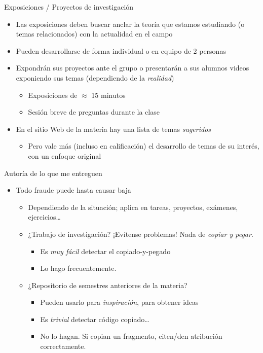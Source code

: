 \documentclass[presentation]{beamer}
\begin{document}
\begin{frame}[label={sec:org58a822f}]{Exposiciones / Proyectos de investigación}
\begin{itemize}
\item Las exposiciones deben buscar anclar la teoría que estamos
estudiando (o temas relacionados) con la actualidad en el campo
\item Pueden desarrollarse de forma individual o en equipo de 2 personas
\item Expondrán sus proyectos ante el grupo o presentarán a sus alumnos
videos exponiendo sus temas (dependiendo de la \emph{realidad})
\begin{itemize}
\item Exposiciones de \(\approx\) 15 minutos
\item Sesión breve de preguntas durante la clase
\end{itemize}
\item En el sitio Web de la materia hay una lista de temas \emph{sugeridos}
\begin{itemize}
\item Pero vale más (incluso en calificación) el desarrollo de temas de
su interés, con un enfoque original
\end{itemize}
\end{itemize}
\end{frame}

\begin{frame}[label={sec:org1ae1665}]{Autoría de lo que me entreguen}
\begin{itemize}
\item \alert{Todo fraude puede hasta causar baja}
\begin{itemize}
\item Dependiendo de la situación; aplica en tareas, proyectos, exámenes,
ejercicios\ldots{}
\item ¿Trabajo de investigación? ¡Evítense problemas! Nada de \emph{copiar y
pegar}.
\begin{itemize}
\item Es \emph{muy fácil} detectar el copiado-y-pegado
\item Lo hago frecuentemente.
\end{itemize}
\item ¿Repositorio de semestres anteriores de la materia?
\begin{itemize}
\item Pueden usarlo para \emph{inspiración}, para obtener ideas
\item Es \emph{trivial} detectar código copiado\ldots{}
\item No lo hagan. Si copian un fragmento, citen/den atribución
correctamente.
\end{itemize}
\end{itemize}
\end{itemize}
\end{frame}
\end{document}
